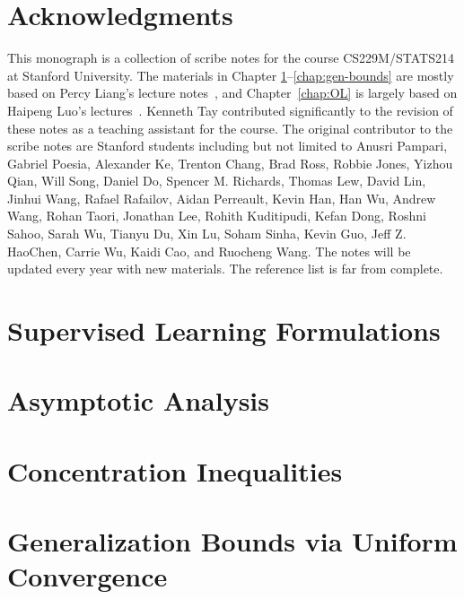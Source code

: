 \documentclass[oneside, openany]{book}
\renewcommand{\cite}[1]{\citep{#1}}
\theoremstyle{definition}
\theoremstyle{remark}
\numberwithin{section}{chapter}
\numberwithin{equation}{chapter}
\begin{document}
	\chapter*{Acknowledgments}
	\setcounter{page}{5}
	This monograph is a collection of scribe notes for the course CS229M/STATS214 at Stanford University. The materials in Chapter \ref{chap:supervised}--\ref{chap:gen-bounds} are mostly based on Percy Liang's lecture notes~\cite{percynotes}, and Chapter~\ref{chap:OL} is largely based on Haipeng Luo's lectures~\cite{haipengnotes}. Kenneth Tay contributed significantly to the revision of these notes as a teaching assistant for the course. The original contributor to the scribe notes are Stanford students including but not limited to Anusri Pampari, Gabriel Poesia, Alexander Ke, Trenton Chang, Brad Ross, Robbie Jones, Yizhou Qian, Will Song, Daniel Do, Spencer M. Richards, Thomas Lew, David Lin, Jinhui Wang, Rafael Rafailov, Aidan Perreault, Kevin Han, Han Wu, Andrew Wang, Rohan Taori, Jonathan Lee, Rohith Kuditipudi, Kefan Dong, Roshni Sahoo, Sarah Wu, Tianyu Du, Xin Lu, Soham Sinha, Kevin Guo, Jeff Z. HaoChen, Carrie Wu, Kaidi Cao, and Ruocheng Wang.  The notes will be updated every year with new materials. The reference list is far from complete.
	
	
	
	\chapter{Supervised Learning Formulations}\label{chap:supervised}
	
	
	\chapter{Asymptotic Analysis}\label{chap:asymp}
	
	
	\chapter{Concentration Inequalities}\label{chap:conc}
	
	
	\chapter{Generalization Bounds via Uniform Convergence}\label{chap:uc}
	
	
	
	
\end{document}
